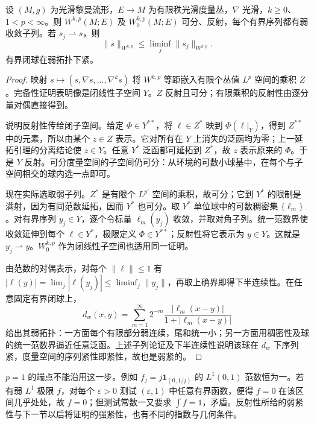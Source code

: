 \begin{theorem}\label{g3:thm:sobolev-weak-compactness}
	设 \((M,g)\) 为光滑黎曼流形，\(E\to M\) 为有限秩光滑度量丛，\(\nabla\) 光滑，\(k\ge0\)、\(1<p<\infty\)。则 \(W^{k,p}(M;E)\) 及 \(W^{k,p}_0(M;E)\) 可分、反射，每个有界序列都有弱收敛子列。若 \(s_j\rightharpoonup s\)，则
	\[
		\|s\|_{W^{k,p}}\le\liminf_j\|s_j\|_{W^{k,p}}.
	\]
	有界闭球在弱拓扑下紧。
\end{theorem}
\begin{proof}
	映射 \(s\mapsto(s,\nabla s,\ldots,\nabla^ks)\) 将 \(W^{k,p}\) 等距嵌入有限个丛值 \(L^p\) 空间的乘积 \(Z\)。完备性证明表明像是闭线性子空间 \(Y\)。\(Z\) 反射且可分；有限乘积的反射性由逐分量对偶直接得到。

	说明反射性传给闭子空间。给定 \(\Phi\in Y^{**}\)，将 \(\ell\in Z^*\) 映到 \(\Phi(\ell|_Y)\)，得到 \(Z^{**}\) 中的元素，所以由某个 \(z\in Z\) 表示。它对所有在 \(Y\) 上消失的泛函均为零；上一延拓引理的分离结论使 \(z\in Y\)。任意 \(Y^*\) 泛函都可延拓到 \(Z^*\)，故 \(z\) 表示原来的 \(\Phi\)。于是 \(Y\) 反射。可分度量空间的子空间仍可分：从环境的可数小球基中，在每个与子空间相交的球内选一点即可。

	现在实际选取弱子列。\(Z^*\) 是有限个 \(L^{p'}\) 空间的乘积，故可分；它到 \(Y^*\) 的限制是满射，因为有同范数延拓，因而 \(Y^*\) 也可分。取 \(Y^*\) 单位球中的可数稠密集 \(\{\ell_m\}\)。对有界序列 \(y_j\in Y\)，逐个令标量 \(\ell_m(y_j)\) 收敛，并取对角子列。统一范数界使收敛延伸到每个 \(\ell\in Y^*\)，极限定义 \(\Phi\in Y^{**}\)；反射性将它表示为 \(y\in Y\)。这就是 \(y_j\rightharpoonup y\)。\(W^{k,p}_0\) 作为闭线性子空间也适用同一证明。

	由范数的对偶表示，对每个 \(\|\ell\|\le1\) 有 \(|\ell(y)|=\lim_j|\ell(y_j)|\le\liminf_j\|y_j\|\)，再取上确界即得下半连续性。在任意固定有界闭球上，
	\[
		d_w(x,y)=\sum_{m=1}^\infty2^{-m}\frac{|\ell_m(x-y)|}{1+|\ell_m(x-y)|}
	\]
	给出其弱拓扑：一方面每个有限部分弱连续，尾和统一小；另一方面用稠密性及球的统一范数界逼近任意泛函。上述子列论证及下半连续性说明该球在 \(d_w\) 下序列紧，度量空间的序列紧性即紧性，故也是弱紧的。
\end{proof}

\(p=1\) 的端点不能沿用这一步。例如 \(f_j=j\mathbf1_{(0,1/j)}\) 的 \(L^1(0,1)\) 范数恒为一。若有弱 \(L^1\) 极限 \(f\)，对每个 \(\varepsilon>0\) 测试 \((\varepsilon,1)\) 中任意有界函数，便得 \(f=0\) 在该区间几乎处处，故 \(f=0\)；但测试常数一又要求 \(\int f=1\)，矛盾。反射性所给的弱紧性与下一节以后将证明的强紧性，也有不同的指数与几何条件。
